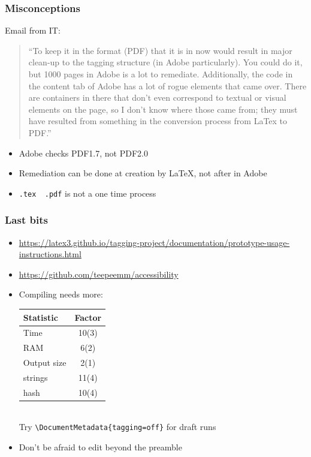 \documentclass{ltx-talk}
\begin{document}

\begin{frame}
\frametitle{Misconceptions}
Email from IT:
\begin{quote}
\!\!``To keep it in the format (PDF) that it is in now would result in major \alert<3>{clean-up} to the tagging structure (\alert<3>{in Adobe} particularly). You could do it, but 1000 pages \alert<3>{in Adobe} is a lot \alert<3>{to remediate}. Additionally, the code in the content tab of Adobe has a lot of \alert<2>{rogue elements} that came over. There are \alert<2>{containers in there that don't even correspond to textual or visual elements on the page}, so I don't know where those came from; they must have resulted from something in the conversion process from LaTex to PDF.''
\end{quote}\bigskip
\begin{itemize}
\item<1-|alert@2> Adobe checks PDF1.7, not PDF2.0
\item<1-|alert@3> Remediation can be done at creation by \LaTeX, not after in Adobe
\item \texttt{.tex \textrightarrow\ .pdf} is not a one time process
\end{itemize}
\end{frame}

\begin{frame*}
\frametitle{Last bits}
\begin{itemize}
\item \url{https://latex3.github.io/tagging-project/documentation/prototype-usage-instructions.html}
\item \url{https://github.com/teepeemm/accessibility}
\item Compiling needs more:\smallskip\\
\begin{tabular}{lS[table-format=2(1),uncertainty-mode=separate]}\toprule
Statistic & Factor \\\midrule
Time & 10(3) \\
RAM & 6(2) \\
Output size & 2(1) \\
strings & 11(4)\\
hash & 10(4)\\\bottomrule
\end{tabular}
\smallskip\\
Try \verb|\DocumentMetadata{tagging=off}| for draft runs
\item Don't be afraid to edit beyond the preamble
\end{itemize}
\end{frame*}
\end{document}

